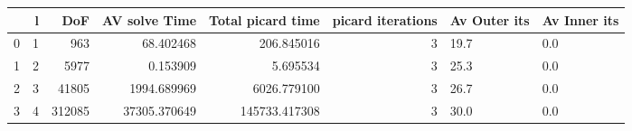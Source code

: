 \begin{tabular}{lrrrrrll}
\toprule
{} &  l &     DoF &  AV solve Time &  Total picard time &  picard iterations & Av Outer its & Av Inner its \\
\midrule
0 &  1 &     963 &      68.402468 &         206.845016 &                  3 &         19.7 &          0.0 \\
1 &  2 &    5977 &       0.153909 &           5.695534 &                  3 &         25.3 &          0.0 \\
2 &  3 &   41805 &    1994.689969 &        6026.779100 &                  3 &         26.7 &          0.0 \\
3 &  4 &  312085 &   37305.370649 &      145733.417308 &                  3 &         30.0 &          0.0 \\
\bottomrule
\end{tabular}
